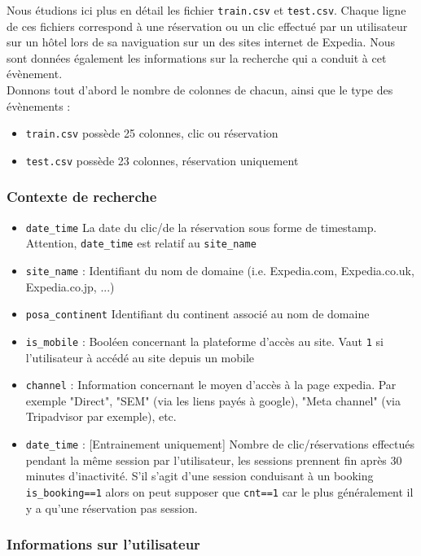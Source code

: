 Nous étudions ici plus en détail les fichier \verb|train.csv| et \verb|test.csv|. Chaque ligne de ces fichiers correspond à une réservation ou un clic effectué par un utilisateur sur un hôtel lors de sa naviguation sur un des sites internet de Expedia. Nous sont données également les informations sur la recherche qui a conduit à cet évènement.\\

Donnons tout d'abord le nombre de colonnes de chacun, ainsi que le type des évènements :
\begin{itemize}[label=$\circ$]
	\item \verb|train.csv| possède 25 colonnes, clic ou réservation
	\item \verb|test.csv| possède 23 colonnes, réservation uniquement
\end{itemize}

\subsubsection{Contexte de recherche}

\begin{itemize}[label=$\triangleright$]
	\item \verb|date_time| La date du clic/de la réservation sous forme de timestamp. Attention, \verb|date_time| est relatif au \verb|site_name| 
	\item \verb|site_name| : Identifiant du nom de domaine (i.e. Expedia.com, Expedia.co.uk, Expedia.co.jp, ...) \
	\item \verb|posa_continent| Identifiant du continent associé au nom de domaine 
	\item \verb|is_mobile| : Booléen concernant la plateforme d'accès au site. Vaut \verb|1| si l'utilisateur à accédé au site depuis un mobile 
	\item \verb|channel| : Information concernant le moyen d'accès à la page expedia. Par exemple "Direct", "SEM" (via les liens payés à google), "Meta channel" (via Tripadvisor par exemple), etc.
	\item \verb|date_time| : [Entrainement uniquement] Nombre de clic/réservations effectués pendant la même session par l'utilisateur, les sessions prennent fin après 30 minutes d'inactivité. S'il s'agit d'une session conduisant à un booking \verb|is_booking==1| alors on peut supposer que \verb|cnt==1| car le plus généralement il y a qu'une réservation pas session.
\end{itemize}

\subsubsection{Informations sur l'utilisateur}

